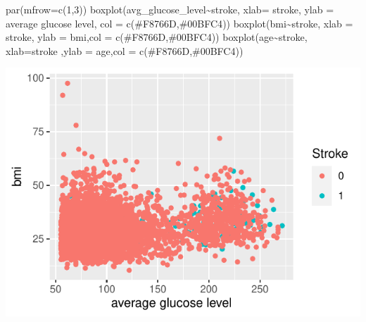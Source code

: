 \documentclass[
]{article}
\newenvironment{Shaded}{\begin{snugshade}}{\end{snugshade}}
\newcommand{\AttributeTok}[1]{\textcolor[rgb]{0.77,0.63,0.00}{#1}}
\newcommand{\DecValTok}[1]{\textcolor[rgb]{0.00,0.00,0.81}{#1}}
\newcommand{\FunctionTok}[1]{\textcolor[rgb]{0.00,0.00,0.00}{#1}}
\newcommand{\NormalTok}[1]{#1}
\newcommand{\SpecialCharTok}[1]{\textcolor[rgb]{0.00,0.00,0.00}{#1}}
\newcommand{\StringTok}[1]{\textcolor[rgb]{0.31,0.60,0.02}{#1}}
\begin{document}
\begin{Shaded}
\begin{Highlighting}[]
\FunctionTok{par}\NormalTok{(}\AttributeTok{mfrow=}\FunctionTok{c}\NormalTok{(}\DecValTok{1}\NormalTok{,}\DecValTok{3}\NormalTok{))}
\FunctionTok{boxplot}\NormalTok{(avg\_glucose\_level}\SpecialCharTok{\textasciitilde{}}\NormalTok{stroke, }\AttributeTok{xlab=} \StringTok{\textquotesingle{}stroke\textquotesingle{}}\NormalTok{, }
        \AttributeTok{ylab =} \StringTok{\textquotesingle{}average glucose level\textquotesingle{}}\NormalTok{, }\AttributeTok{col =} \FunctionTok{c}\NormalTok{(}\StringTok{\textquotesingle{}\#F8766D\textquotesingle{}}\NormalTok{,}\StringTok{\textquotesingle{}\#00BFC4\textquotesingle{}}\NormalTok{))}
\FunctionTok{boxplot}\NormalTok{(bmi}\SpecialCharTok{\textasciitilde{}}\NormalTok{stroke, }\AttributeTok{xlab =} \StringTok{\textquotesingle{}stroke\textquotesingle{}}\NormalTok{, }\AttributeTok{ylab =} \StringTok{\textquotesingle{}bmi\textquotesingle{}}\NormalTok{,}\AttributeTok{col =} \FunctionTok{c}\NormalTok{(}\StringTok{\textquotesingle{}\#F8766D\textquotesingle{}}\NormalTok{,}\StringTok{\textquotesingle{}\#00BFC4\textquotesingle{}}\NormalTok{))}
\FunctionTok{boxplot}\NormalTok{(age}\SpecialCharTok{\textasciitilde{}}\NormalTok{stroke, }\AttributeTok{xlab=}\StringTok{\textquotesingle{}stroke\textquotesingle{}}\NormalTok{ ,}\AttributeTok{ylab =} \StringTok{\textquotesingle{}age\textquotesingle{}}\NormalTok{,}\AttributeTok{col =} \FunctionTok{c}\NormalTok{(}\StringTok{\textquotesingle{}\#F8766D\textquotesingle{}}\NormalTok{,}\StringTok{\textquotesingle{}\#00BFC4\textquotesingle{}}\NormalTok{))}
\end{Highlighting}
\end{Shaded}

\includegraphics{stat-project-stroke_files/figure-latex/unnamed-chunk-11-1.pdf}
\end{document}
